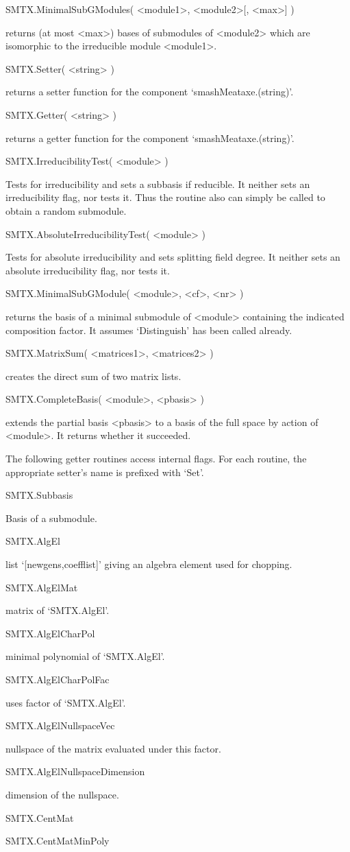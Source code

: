 \>SMTX.MinimalSubGModules( <module1>, <module2>[, <max>] )

returns (at most <max>) bases of submodules of <module2> which are
isomorphic to the irreducible module  <module1>.

\>SMTX.Setter( <string> )

returns a setter function for the component `smashMeataxe.(string)'.

\>SMTX.Getter( <string> )

returns a getter function for the component `smashMeataxe.(string)'.

\>SMTX.IrreducibilityTest( <module> )

Tests for irreducibility and sets a subbasis if reducible. It neither sets
an irreducibility flag, nor tests it. Thus the routine also can simply be
called to obtain a random submodule.

\>SMTX.AbsoluteIrreducibilityTest( <module> )

Tests for absolute irreducibility and sets splitting field degree. It
neither sets an absolute irreducibility flag, nor tests it.

\>SMTX.MinimalSubGModule( <module>, <cf>, <nr> )

returns the basis of a minimal submodule of <module> containing the
indicated composition factor. It assumes `Distinguish' has been called
already.

\>SMTX.MatrixSum( <matrices1>, <matrices2> )

creates the direct sum of two matrix lists.

\>SMTX.CompleteBasis( <module>, <pbasis> )

extends the partial basis <pbasis> to a basis of the full space
by action of <module>. It returns whether it succeeded.


The following getter routines access internal flags. For each routine, the
appropriate setter's name is prefixed with `Set'.

\>SMTX.Subbasis

Basis of a submodule.

\>SMTX.AlgEl

list `[newgens,coefflist]' giving an algebra element used for chopping.

\>SMTX.AlgElMat

matrix of `SMTX.AlgEl'.

\>SMTX.AlgElCharPol

minimal polynomial of `SMTX.AlgEl'.

\>SMTX.AlgElCharPolFac

uses factor of `SMTX.AlgEl'.

\>SMTX.AlgElNullspaceVec

nullspace of the matrix evaluated under this factor.

\>SMTX.AlgElNullspaceDimension

dimension of the nullspace.

\>SMTX.CentMat


\>SMTX.CentMatMinPoly


